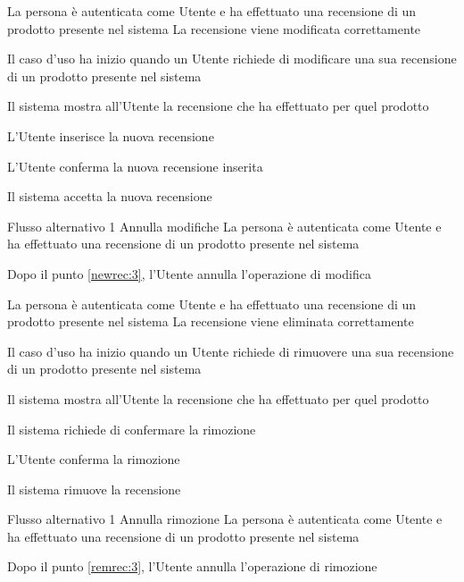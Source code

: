 \tabcuvspace

{}
{La persona è autenticata come Utente e ha effettuato una recensione di un prodotto presente nel sistema}
{La recensione viene modificata correttamente}
{\begin{enumCU}
	\item Il caso d'uso ha inizio quando un Utente richiede di modificare una sua recensione di un prodotto presente nel sistema
	\item Il sistema mostra all'Utente la recensione che ha effettuato per quel prodotto
	\item L'Utente inserisce la nuova recensione \label{newrec:3}
	\item L'Utente conferma la nuova recensione inserita
	\item Il sistema accetta la nuova recensione
\end{enumCU}}
%
{Flusso alternativo 1}%
{Annulla modifiche}%
{La persona è autenticata come Utente e ha effettuato una recensione di un prodotto presente nel sistema}
{\postNulle}%
{\begin{enumCU}
		\item Dopo il punto \ref{newrec:3}, l'Utente annulla l'operazione di modifica
	\end{enumCU}}%

\tabcuvspace

{}
{La persona è autenticata come Utente e ha effettuato una recensione di un prodotto presente nel sistema}
{La recensione viene eliminata correttamente}
{\begin{enumCU}
	\item Il caso d'uso ha inizio quando un Utente richiede di rimuovere una sua recensione di un prodotto presente nel sistema
	\item Il sistema mostra all'Utente la recensione che ha effettuato per quel prodotto
	\item Il sistema richiede di confermare la rimozione \label{remrec:3}
	\item L'Utente conferma la rimozione
	\item Il sistema rimuove la recensione
\end{enumCU}}
%
{Flusso alternativo 1}%
{Annulla rimozione}%
{La persona è autenticata come Utente e ha effettuato una recensione di un prodotto presente nel sistema}
{\postNulle}%
{\begin{enumCU}
		\item Dopo il punto \ref{remrec:3}, l'Utente annulla l'operazione di rimozione
	\end{enumCU}}%

